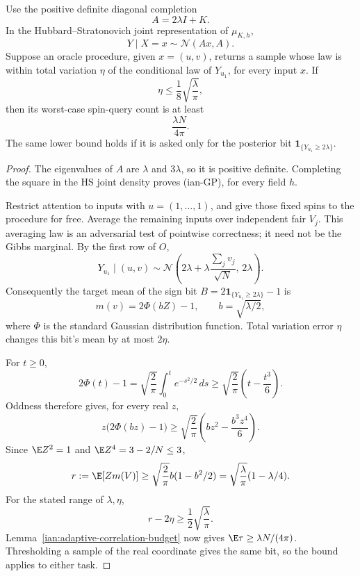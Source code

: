 \begin{proposition}
\label{ian:hs-posterior-linear-lower-bound}
Use the positive definite diagonal completion
\[
 A=2\lambda I+K.
\]
In the Hubbard--Stratonovich joint representation of \(\mu_{K,h}\),
\[
 Y\mid X=x\sim\mathcal N(Ax,A).
 \tag{ian-GP}
\]
Suppose an oracle procedure, given \(x=(u,v)\), returns a sample whose
law is within total variation \(\eta\) of the conditional law of
\(Y_{u_1}\), for every input \(x\). If
\[
 \eta\le\frac18\sqrt{\frac{\lambda}{\pi}},
\]
then its worst-case spin-query count is at least
\[
 \frac{\lambda N}{4\pi}.
 \tag{ian-GPL}
\]
The same lower bound holds if it is asked only for the posterior bit
\(\mathbf1_{\{Y_{u_1}\ge2\lambda\}}\).
\end{proposition}

\begin{proof}
The eigenvalues of \(A\) are \(\lambda\) and \(3\lambda\), so it is
positive definite. Completing the square in the HS joint density
proves (ian-GP), for every field \(h\).

Restrict attention to inputs with \(u=(1,\ldots,1)\), and give those
fixed spins to the procedure for free. Average the remaining inputs
over independent fair \(V_j\). This averaging law is an adversarial
test of pointwise correctness; it need not be the Gibbs marginal.
By the first row of \(O\),
\[
 Y_{u_1}\mid(u,v)
 \sim\mathcal N\left(
 2\lambda+\lambda\frac{\sum_jv_j}{\sqrt N},\,2\lambda\right).
\]
Consequently the target mean of the sign bit
\(B=2\mathbf1_{\{Y_{u_1}\ge2\lambda\}}-1\) is
\[
 m(v)=2\Phi(bZ)-1,\qquad b=\sqrt{\lambda/2},
\]
where \(\Phi\) is the standard Gaussian distribution function.
Total variation error \(\eta\) changes this bit's mean by at most
\(2\eta\).

For \(t\ge0\),
\[
 2\Phi(t)-1
 =\sqrt{\frac2\pi}\int_0^t e^{-s^2/2}\,ds
 \ge\sqrt{\frac2\pi}\left(t-\frac{t^3}{6}\right).
\]
Oddness therefore gives, for every real \(z\),
\[
 z\bigl(2\Phi(bz)-1\bigr)
 \ge\sqrt{\frac2\pi}
       \left(bz^2-\frac{b^3z^4}{6}\right).
\]
Since \(\E Z^2=1\) and \(\E Z^4=3-2/N\le3\),
\[
 r:=\E[Zm(V)]
 \ge\sqrt{\frac2\pi}b(1-b^2/2)
 =\sqrt{\frac{\lambda}{\pi}}(1-\lambda/4).
\]
For the stated range of \(\lambda,\eta\),
\[
 r-2\eta\ge\frac12\sqrt{\frac{\lambda}{\pi}}.
\]
Lemma~\ref{ian:adaptive-correlation-budget} now gives
\(\E\tau\ge\lambda N/(4\pi)\). Thresholding a sample of the real
coordinate gives the same bit, so the bound applies to either task.
\end{proof}

